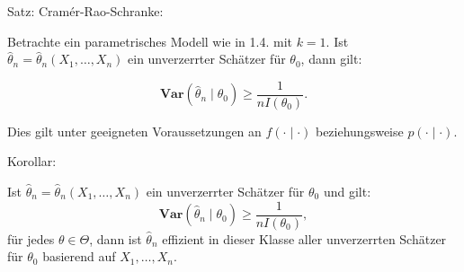 \documentclass[10pt]{article}
\newcommand{\FZV}{X_1, \ldots, X_n} %
\begin{document}
	Satz: Cramér-Rao-Schranke:
	
	Betrachte ein parametrisches Modell wie in 1.4. mit $k = 1$. Ist $\hat{\theta}_n = \hat{\theta}_n \left(\FZV \right)$ ein unverzerrter Schätzer für $\theta_0$, dann gilt:
	
	\begin{equation*}
		\textbf{Var}(\hat{\theta}_n \mid \theta_0) \geq \frac{1}{nI(\theta_0)}.
	\end{equation*}
	
	Dies gilt unter geeigneten Voraussetzungen an $f(\cdot \mid \cdot)$ beziehungsweise $p(\cdot \mid \cdot)$. 
	
	Korollar:
	
	Ist $\hat{\theta}_n = \hat{\theta}_n (\FZV)$ ein unverzerrter Schätzer für $\theta_0$ und gilt:
	\begin{equation*}
		\textbf{Var}(\hat{\theta}_n \mid \theta_0) \geq \frac{1}{nI(\theta_0)},
	\end{equation*}
	für jedes $\theta \in \Theta $, dann ist $\hat{\theta}_n$ effizient in dieser Klasse aller unverzerrten Schätzer für $\theta_0$ basierend auf $\FZV$.
	
\end{document}
